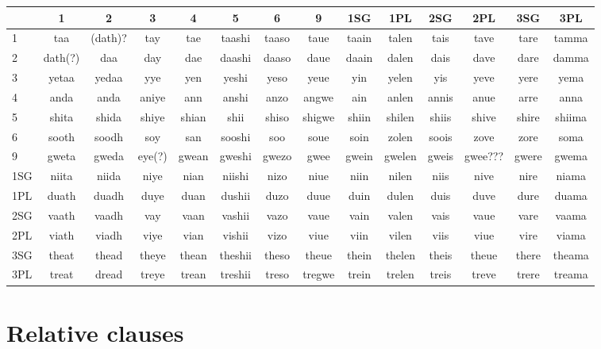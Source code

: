 \documentclass[9pt]{amsart}
\begin{document}
\begin{center}
  \begin{tabular}{ | l | c | c | c | c | c | c | c | c | c | c | c | c | c |}
    \hline
      & 1 & 2 & 3 & 4 & 5 & 6 & 9 & 1SG & 1PL & 2SG & 2PL & 3SG & 3PL \\ \hline
    1 & taa & (dath)? & tay & tae & taashi & taaso & taue & taain & talen & tais & tave & tare & tamma  \\ \hline
    2 & dath(?) & daa & day & dae & daashi & daaso & daue & daain & dalen & dais & dave & dare & damma \\ \hline
    3 & yetaa & yedaa & yye & yen & yeshi & yeso & yeue & yin  & yelen & yis & yeve & yere & yema \\ \hline
    4 & anda & anda & aniye & ann & anshi & anzo & angwe & ain & anlen & annis & anue & arre & anna \\ \hline
    5 & shita & shida & shiye & shian & shii & shiso & shigwe & shiin & shilen & shiis & shive & shire  & shiima\\ \hline
    6 & sooth & soodh & soy & san & sooshi & soo & soue & soin & zolen & soois & zove & zore & soma \\ \hline
    9 & gweta & gweda & eye(?) & gwean & gweshi & gwezo & gwee & gwein & gwelen & gweis & gwee??? & gwere & gwema\\ \hline
    1SG & niita & niida & niye & nian & niishi & nizo & niue  & niin & nilen & niis & nive & nire & niama \\ \hline
    1PL & duath & duadh & duye & duan & dushii & duzo & duue & duin & dulen & duis & duve & dure & duama \\ \hline 
    2SG & vaath & vaadh & vay & vaan & vashii & vazo & vaue & vain & valen & vais & vaue & vare & vaama \\ \hline
    2PL & viath & viadh & viye & vian & vishii & vizo & viue & viin & vilen & viis & viue & vire & viama \\ \hline
  	3SG & theat & thead & theye & thean & theshii & theso & theue & thein & thelen & theis & theue & there & theama \\ \hline
  	3PL & treat & dread & treye & trean & treshii & treso & tregwe & trein & trelen & treis & treve & trere & treama \\ \hline
  \end{tabular}
\end{center}

\section{Relative clauses}
\end{document}
